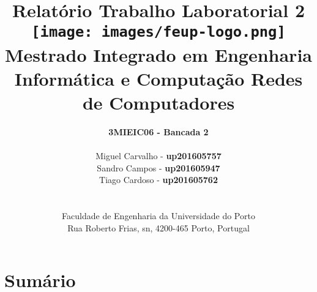 \documentclass[a4paper, 11pt]{article}
\begin{document}
\setlength{\textwidth}{16cm}
\setlength{\textheight}{22cm}

\title{
\huge\textbf{Relatório}\linebreak\linebreak
\Huge\textbf{Trabalho Laboratorial 2}\linebreak\linebreak
\linebreak\linebreak
\centering \texttt{[image: images/feup-logo.png]}\linebreak\linebreak
\linebreak
\large Mestrado Integrado em Engenharia Informática e Computação \linebreak\linebreak
\Large{Redes de Computadores}\linebreak
}

\author{\textbf{3MIEIC06 - Bancada 2}\\
\linebreak\\
Miguel Carvalho - \textbf{up201605757} \\
Sandro Campos - \textbf{up201605947} \\
Tiago Cardoso - \textbf{up201605762} \\
\linebreak\linebreak \\
 \\ Faculdade de Engenharia da Universidade do Porto \\ Rua Roberto Frias, s\/n, 4200-465 Porto, Portugal \linebreak\linebreak
\linebreak\linebreak\vspace{1cm}}

\maketitle
\thispagestyle{empty}

\newpage

\tableofcontents 

\newpage

\section{Sumário}
\normalsize 
\end{document}
